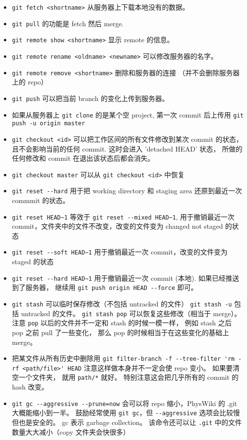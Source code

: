 \begin{itemize}
\item \verb|git fetch <shortname>| 从服务器上下载本地没有的数据。
\item \verb|git pull| 的功能是 fetch 然后 merge.
\item \verb|git remote show <shortname>| 显示 remote 的信息。
\item \verb|git remote rename <oldname> <newname>| 可以修改服务器的名字。
\item \verb|git remote remove <shortname>| 删除和服务器的连接 （并不会删除服务器上的 repo）
\item \verb|git push| 可以把当前 branch 的变化上传到服务器。
\item 如果从服务器上 \verb|git clone| 的是某个空 project, 第一次 commit 后上传用 \verb|git push -u origin master|
\item \verb|git checkout <id>| 可以把工作区间的所有文件修改到某次 commit 的状态， 且不会影响当前的任何 commit. 这时会进入 'detached HEAD' 状态， 所做的任何修改和 commit 在退出该状态后都会消失。
\item \verb|git checkout master| 可以从 \verb|git checkout <id>| 中恢复
\item \verb|git reset --hard| 用于把 working directory 和 staging area 还原到最近一次 commmit 的状态。
\item \verb|git reset HEAD~1| 等效于 \verb|git reset --mixed HEAD~1|, 用于撤销最近一次 commit，文件夹中的文件不改变，改变的文件变为 changed not staged 的状态
\item \verb|git reset --soft HEAD~1| 用于撤销最近一次 commit，改变的文件变为 staged 的状态
\item \verb|git reset --hard HEAD~1| 用于撤销最近一次 commit (本地). 如果已经推送到了服务器， 继续用 \verb|git push origin HEAD --force| 即可。
\item \verb|git stash| 可以临时保存修改（不包括 untracked 的文件） \verb|git stash -u| 包括 untracked 的文件。 \verb|git stash pop| 可以恢复这些修改（相当于 merge）。 注意 \verb|pop| 以后的文件并不一定和 stash 的时候一模一样， 例如 stash 之后 pop 之前 pull 了一些变化， 那么 pop 的时候相当于在这些变化的基础上 merge。
\item 把某文件从所有历史中删除用 \verb|git filter-branch -f --tree-filter 'rm -rf <path/file>' HEAD| 注意这样做本身并不一定会使 repo 变小。 如果要清空一个文件夹， 就用 \verb|path/*| 就好。 特别注意这会把几乎所有的 commit 的 hash 改变。
\item \verb|git gc --aggressive --prune=now| 会可以将 repo 缩小，PhysWiki 的 .git 大概能缩小到一半。 鼓励经常使用 \verb|git gc|，但 \verb|--aggressive| 选项会比较慢但也是安全的。 gc 表示 garbage collection。 该命令还可以让 \verb|.git| 中的文件数量大大减小（copy 文件夹会快很多）

\end{itemize}
